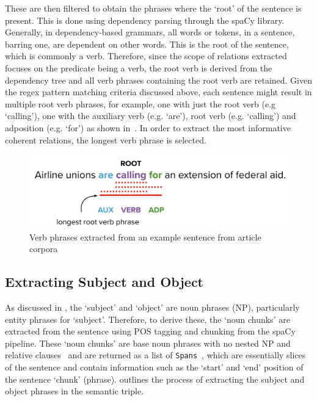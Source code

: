 These are then filtered to obtain the phrases where the `root' of the sentence is present. This is done using dependency parsing through the spaCy library. Generally, in dependency-based grammars, all words or tokens, in a sentence,  barring one,  are dependent on other words.  This is the root of the sentence, which is commonly a verb. Therefore, since the scope of relations extracted focuses on the predicate being a verb, the root verb is derived from the dependency tree and all verb phrases containing the root verb are retained. Given the regex pattern matching criteria discussed above, each sentence might result in multiple root verb phrases, for example, one with just the root verb (e.g `calling'), one with the auxiliary verb (e.g. `are'), root verb (e.g. `calling') and adposition (e.g. `for') as shown in~. In order to extract the most informative coherent relations, the longest verb phrase is selected. 

\begin{figure}[H]
\centering
\includegraphics[scale=0.3]{images/verb_phrases.png}
\caption{Verb phrases extracted from an example sentence from article corpora}
\label{verb_phrases}
\end{figure}

\subsection{Extracting Subject and Object} \label{extracting_subj_obj}
As discussed in , the `subject' and `object' are noun phrases (NP), particularly entity phrases for `subject'. Therefore, to derive these, the `noun chunks' are extracted from the sentence using POS tagging and chunking from the spaCy pipeline. These `noun chunks' are base noun phrases with no nested NP and relative clauses~\cite{spacy} and are returned as a list of \texttt{Spans}~\cite{spacy}, which are essentially slices of the sentence and contain information such as the `start' and `end' position of the sentence `chunk' (phrase).  outlines the process of extracting the subject and object phrases in the semantic triple.


